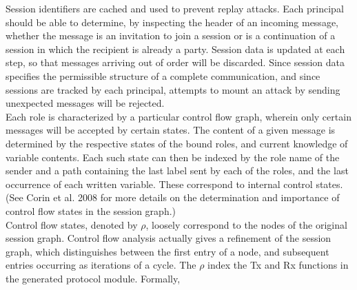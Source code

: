 \documentclass[a4paper,10pt]{article}
\begin{document}
Session identifiers are cached and used to prevent replay attacks.  Each principal should be able to
determine, by inspecting the header of an incoming message, whether the message is an invitation to join
a session or is a continuation of a session in which the recipient is already a party.  Session data
is updated at each step, so that messages arriving out of order will be discarded.  Since session
data specifies the permissible structure of a complete communication, and since sessions are tracked
by each principal, attempts to mount an attack by sending unexpected messages will be rejected.\\

Each role is characterized by a particular control flow graph, wherein only certain messages will
be accepted by certain states.  The content of a given message is determined by the respective states
of the bound roles, and current knowledge of variable contents.  Each such state can then be indexed
by the role name of the sender and a path containing the last label sent by each of the roles,
and the last occurrence of each written variable.  These correspond to internal control states.\\

(See Corin et al. 2008 for more details on the determination and importance of control flow states
in the session graph.)\\

Control flow states, denoted by $\rho$, loosely correspond to the nodes of the original session graph.
Control flow analysis actually gives a refinement of the session graph, which distinguishes between
the first entry of a node, and subsequent entries occurring as iterations of a cycle.  The $\rho$ index
the Tx and Rx functions in the generated protocol module.  Formally,\\
\end{document}
